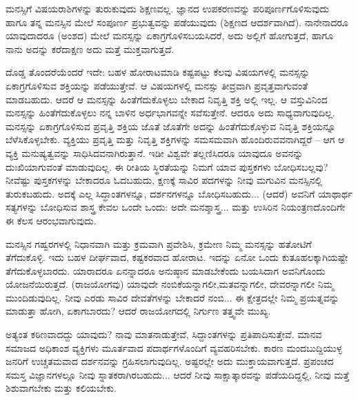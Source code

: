 \vskip 6pt

ಮನಸ್ಸಿಗೆ ವಿಷಯರಾಶಿಗಳನ್ನು ತುರುಕುವುದು ಶಿಕ್ಷಣವಲ್ಲ. ಜ್ಞಾನದ ಉಪಕರಣವನ್ನು ಪರಿಪೂರ್ಣಗೊಳಿಸುವುದು ಹಾಗೂ ತನ್ನ ಮನಸ್ಸಿನ ಮೇಲೆ ಸಂಪೂರ್ಣ ಪ್ರಭುತ್ವವನ್ನು ಪಡೆಯುವುದು (ಶಿಕ್ಷಣದ ಆದರ್ಶವಾಗಿದೆ). ನಾನೇನಾದರೂ ಯಾವುದಾದರೂ (ಅಂಶದ) ಮೇಲೆ ಮನಸ್ಸನ್ನು ಏಕಾಗ್ರಗೊಳಿಸಬಯಸಿದರೆ, ಅದು ಅಲ್ಲಿಗೆ ಹೋಗುತ್ತದೆ, ಹಾಗೂ ನಾನು ಅದನ್ನು ಕರೆದಾಕ್ಷಣ ಅದು ಮತ್ತೆ ಮುಕ್ತವಾಗುತ್ತದೆ.

\vskip 6pt

ದೊಡ್ಡ ತೊಂದರೆಯೆಂದರೆ ಇದೇ: ಬಹಳ ಹೋರಾಟಮಾಡಿ ಕಷ್ಟಪಟ್ಟು ಕೆಲವು ವಿಷಯಗಳಲ್ಲಿ ಮನಸ್ಸನ್ನು ಏಕಾಗ್ರಗೊಳಿಸುವ ಶಕ್ತಿಯನ್ನು ಪಡೆಯುತ್ತೇವೆ. ಆ ವಿಷಯಗಳಲ್ಲಿ ಮನಸ್ಸು ತೀವ್ರವಾಗಿ ಪ್ರವೃತ್ತವಾಗುವಂತೆ ಮಾಡಬಹುದು. ಆದರೆ ಆ ಮನಸ್ಸನ್ನು ಹಿಂತೆಗೆದುಕೊಳ್ಳಲು ಬೇಕಾದ ನಿವೃತ್ತಿ ಶಕ್ತಿ ಅಲ್ಲಿ ಇಲ್ಲ. ಆ ವಸ್ತುವಿನಿಂದ ಮನಸ್ಸನ್ನು ಹಿಂತೆಗೆದುಕೊಳ್ಳಲು ನನ್ನ ಬಾಳಿನ ಅರ್ಧಭಾಗವನ್ನೇ ಸವೆಸುತ್ತೇನೆ. ಆದರೂ ಅದು ಸಾಧ್ಯವಾಗುವುದಿಲ್ಲ. ಮನಸ್ಸನ್ನು ಏಕಾಗ್ರಗೊಳಿಸುವ ಪ್ರವೃತ್ತಿ ಶಕ್ತಿಯ ಜೊತೆ ಜೊತೆಗೇ ಅದನ್ನು ಹಿಂತೆಗೆದುಕೊಳ್ಳುವ ನಿವೃತ್ತಿ ಶಕ್ತಿಯನ್ನೂ ಬೆಳೆಸಿಕೊಳ್ಳಬೇಕು. ವ್ಯಕ್ತಿಯು ಪ್ರವೃತ್ತಿ ಮತ್ತು ನಿವೃತ್ತಿ ಶಕ್ತಿಗಳನ್ನು ಸಮಸಮವಾಗಿ ಹೊಂದಿರುವವನಾಗಿದ್ದರೆ – ಆಗ ಆ ವ್ಯಕ್ತಿ ಮನುಷ್ಯತ್ವವನ್ನು ಸಾಧಿಸಿದವನಾಗಿರುತ್ತಾನೆ. ಇಡೀ ವಿಶ್ವವೇ ತಲ್ಲಣಿಸಿದರೂ ಯಾವುದೂ ಅವನನ್ನು ದುಃಖಿಯಾಗುವಂತೆ ಮಾಡುವುದಿಲ್ಲ. ಈ ರೀತಿಯ ಸ್ಥಿರತೆಯನ್ನು ನಿಮಗೆ ಯಾವ ಪುಸ್ತಕಗಳು ಬೋಧಿಸಬಲ್ಲವು? ನೀವೆಷ್ಟು ಪುಸ್ತಕಗಳನ್ನು ಬೇಕಾದರೂ ಓದಬಹುದು, ಕ್ಷಣಕ್ಕೆ  ಸಾವಿರ ಪದಗಳನ್ನು ನೀವು ಮಗುವಿನ ಮನಸ್ಸಿನಲ್ಲಿ ತುರುಕಬಹುದು. ಅದಕ್ಕೆ ಎಲ್ಲ ಸಿದ್ಧಾಂತಗಳನ್ನೂ, ದರ್ಶನಗಳನ್ನೂ ಬೋಧಿಸಬಹುದು... (ಆದರೆ) ಅವನಿಗೆ ಯಾಥಾರ್ಥ ಸತ್ಯಗಳನ್ನು ಬೋಧಿಸುವ ಶಾಸ್ತ್ರ ಕೇವಲ ಒಂದೇ ಒಂದು: ಅದೇ ಮನಶ್ಶಾಸ್ತ್ರ... ಮತ್ತು ಉಸಿರಿನ ನಿಯಂತ್ರಣದೊಂದಿಗೇ ಈ ಕೆಲಸ ಆರಂಭವಾಗುವುದು.

\vskip 6pt

ಮನಸ್ಸಿನ ಗಹ್ವರಗಳಲ್ಲಿ ನಿಧಾನವಾಗಿ ಮತ್ತು ಕ್ರಮವಾಗಿ ಪ್ರವೇಶಿಸಿ, ಕ್ರಮೇಣ ನಿಮ್ಮ ಮನಸ್ಸನ್ನು ಹತೋಟಿಗೆ ತೆಗೆದುಕೊಳ್ಳಿ. ಇದು ಬಹಳ ದೀರ್ಘವಾದ, ಕಷ್ಟಕರವಾದ ಹೋರಾಟ. ಇದನ್ನು ಏನೋ ಒಂದು ಕುತೂಹಲಕ್ಕಾಗಿಯಷ್ಟೇ ತೆಗೆದುಕೊಳ್ಳಬಾರದು. ಯಾರಾದರೂ ಏನನ್ನಾದರೂ ಅನುಷ್ಠಾನ ಮಾಡಬೇಕೆಂದು ಬಯಸಿದಾಗ ಅವನಿಗೊಂದು ಯೋಜನೆಯಿರುತ್ತದೆ. (ರಾಜಯೋಗವು) ಯಾವುದೇ ನಂಬಿಕೆಯನ್ನಾಗಲೀ,\break ಮತವನ್ನಾಗಲೀ, ದೇವರನ್ನಾಗಲೀ ನಿಮ್ಮ ಮುಂದಿಡುವುದಿಲ್ಲ. ನೀವು ಎರಡು ಸಾವಿರ ದೇವತೆಗಳನ್ನು ಬೇಕಾದರೆ ನಂಬಿ... ಈ ಕ್ಷೇತ್ರದಲ್ಲೇ ನಿಮ್ಮ ಪ್ರಯತ್ನವನ್ನು ಮಾಡುತ್ತಾ ಹೋಗಿ, ಏಕಾಗಬಾರದು? ಆದರೆ ರಾಜಯೋಗದಲ್ಲಿ ನಿರ್ಗುಣ ತತ್ತ್ವವೇ ಮುಖ್ಯ.

\vskip 6pt

ಅತ್ಯಂತ ಕಠಿಣವಾದದ್ದು ಯಾವುದು? ನಾವು ಮಾತನಾಡುತ್ತೇವೆ, ಸಿದ್ದಾಂತಗಳನ್ನು ಪ್ರತಿಪಾದಿಸುತ್ತೇವೆ. ಮಾನವ ಸಮಾಜದ ಅಧಿಕಾಂಶ ವ್ಯಕ್ತಿಗಳು ಮೂರ್ತವಾದ ಪದಾರ್ಥಗಳೊಂದಿಗೆ ವ್ಯವಹರಿಸಬೇಕು. ಕಾರಣ ಮಂದಬುದ್ದಿಯುಳ್ಳ ಜನರಿಗೆ ಉಚ್ಚತಮವಾದ ದರ್ಶನವನ್ನು ಗ್ರಹಿಸಲಾಗುವುದಿಲ್ಲ. ಅಷ್ಟರಲ್ಲೇ ಅದು ಮುಕ್ತಾಯವಾಗುತ್ತದೆ. ಪ್ರಪಂಚದ ಸಮಸ್ತ ವಿಜ್ಞಾನಗಳಲ್ಲೂ ನೀವು ಸ್ನಾತಕರಾಗಿರಬಹುದು... ಆದರೆ ನೀವು ಸಾಕ್ಷಾತ್ಕಾರವನ್ನು ಪಡೆಯದಿದ್ದಲ್ಲಿ, ನೀವು ಮತ್ತೆ ಶಿಶುವಾಗಬೇಕು ಮತ್ತು ಕಲಿಯಬೇಕು.

\vskip 6pt

